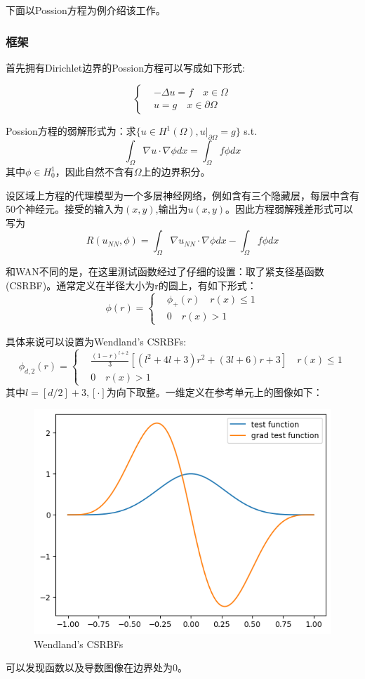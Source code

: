 下面以Possion方程为例介绍该工作。

\subsubsection{框架}
首先拥有Dirichlet边界的Possion方程可以写成如下形式:

$$\left\{\begin{aligned}
    &-\Delta u = f\quad x \in \Omega\\
    &u = g\quad x\in \partial \Omega
\end{aligned}\right.$$

Possion方程的弱解形式为：求$\{u\in H^1(\Omega), u|_{\partial \Omega}=g\}$ s.t.
$$\int_\Omega \nabla u \cdot \nabla \phi dx = \int_\Omega f\phi dx$$
其中$\phi \in H^1_0$，因此自然不含有$\Omega$上的边界积分。

设区域上方程的代理模型为一个多层神经网络，例如含有三个隐藏层，每层中含有50个神经元。接受的输入为$(x,y)$,输出为$u(x,y)$。因此方程弱解残差形式可以写为
$$R(u_{NN}, \phi) = \int_\Omega \nabla u_{NN} \cdot \nabla \phi dx - \int_\Omega f\phi dx$$

和WAN不同的是，在这里测试函数经过了仔细的设置：取了紧支径基函数(CSRBF)。通常定义在半径大小为r的圆上，有如下形式：
$$\phi(r) = \left\{\begin{aligned}
    &\phi_+ (r) \quad r(x)\leq 1\\
    &0 \quad r(x)> 1
\end{aligned}\right.$$

具体来说可以设置为Wendland's CSRBFs:
$$\phi_{d,2}(r) = \left\{\begin{aligned}
    &\frac{(1-r)^{l+2}}{3}\left[(l^2+4l+3)r^2+(3l+6)r+3\right] \quad r(x)\leq 1\\
    &0 \quad r(x)> 1
\end{aligned}\right.$$其中$l = [d/2] + 3,[\cdot]$为向下取整。一维定义在参考单元上的图像如下：

\begin{figure}[H]
    \centering  
    \includegraphics[width=0.6\linewidth]{./pics/final/possion/dgnet1d/WendlandCSRBFs.png}  
    \caption{Wendland's CSRBFs}
\end{figure} 
可以发现函数以及导数图像在边界处为0。

